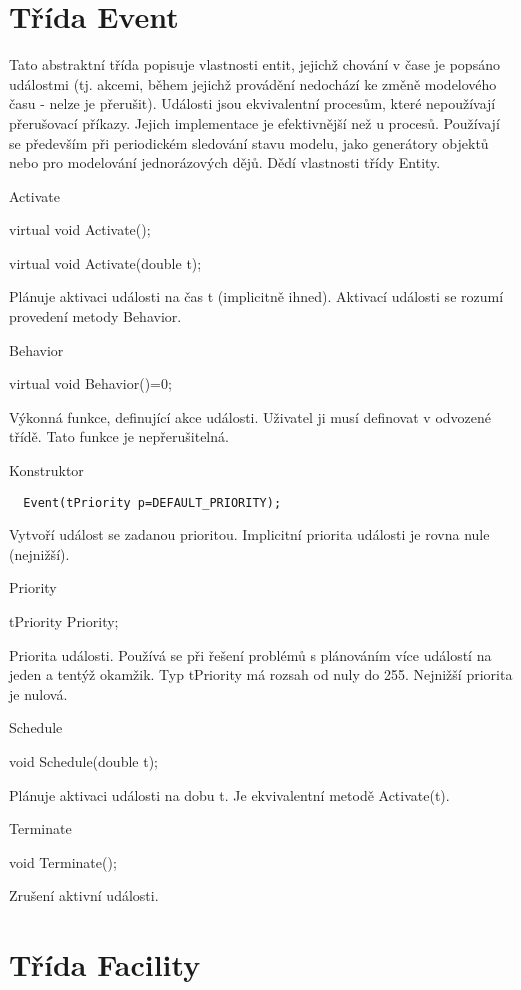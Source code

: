 \documentclass[a4paper]{article}
\begin{document}
\section{Třída Event}

Tato abstraktní třída popisuje vlastnosti entit, jejichž chování
v čase je popsáno událostmi (tj. akcemi, během jejichž provádění
nedochází ke změně modelového času - nelze je přerušit). Události
jsou ekvivalentní procesům, které nepoužívají přerušovací příkazy.
Jejich implementace je efektivnější než u procesů. Používají se především
při periodickém sledování stavu modelu, jako generátory objektů nebo
pro modelování jednorázových dějů. Dědí vlastnosti třídy Entity.


Activate

  virtual void Activate();

  virtual void Activate(double t);


Plánuje aktivaci události na čas t (implicitně ihned). Aktivací
události se rozumí provedení metody Behavior.


Behavior

  virtual void Behavior()=0;


Výkonná funkce, definující akce události. Uživatel ji musí definovat
v odvozené třídě. Tato funkce je nepřerušitelná.


Konstruktor

\begin{verbatim}
  Event(tPriority p=DEFAULT_PRIORITY);
\end{verbatim}


Vytvoří událost se zadanou prioritou. Implicitní priorita události
je rovna nule (nejnižší).


Priority

  tPriority Priority;


Priorita události. Používá se při řešení problémů s plánováním více
událostí na jeden a tentýž okamžik. Typ tPriority má rozsah
od nuly do 255. Nejnižší priorita je nulová.


Schedule

  void Schedule(double t);


Plánuje aktivaci události na dobu t. Je ekvivalentní metodě
Activate(t).


Terminate

  void Terminate();


Zrušení aktivní události.

\section{Třída Facility}
\end{document}
